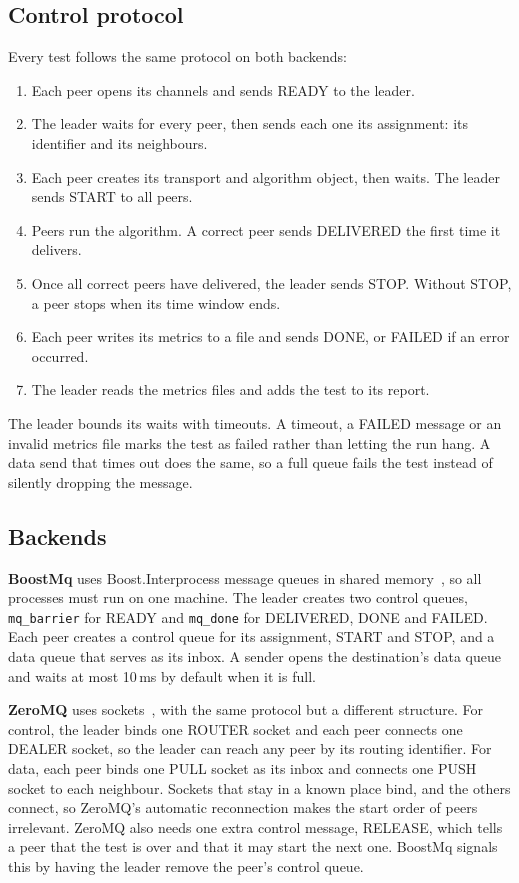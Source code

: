 \documentclass[11pt,a4paper]{article}
\newcommand{\code}[1]{\texttt{#1}}
\begin{document}
\subsection{Control protocol}

Every test follows the same protocol on both backends:
\begin{enumerate}
  \item Each peer opens its channels and sends READY to the leader.
  \item The leader waits for every peer, then sends each one its assignment: its identifier and its
    neighbours.
  \item Each peer creates its transport and algorithm object, then waits. The leader sends START to
    all peers.
  \item Peers run the algorithm. A correct peer sends DELIVERED the first time it delivers.
  \item Once all correct peers have delivered, the leader sends STOP. Without STOP, a peer stops
    when its time window ends.
  \item Each peer writes its metrics to a file and sends DONE, or FAILED if an error occurred.
  \item The leader reads the metrics files and adds the test to its report.
\end{enumerate}
The leader bounds its waits with timeouts. A timeout, a FAILED message or an invalid metrics file
marks the test as failed rather than letting the run hang. A data send that times out does the
same, so a full queue fails the test instead of silently dropping the message.

\subsection{Backends}

\textbf{BoostMq} uses Boost.Interprocess message queues in shared memory~\cite{boost-interprocess},
so all processes must run on one machine. The leader creates two control queues,
\code{mq\_barrier} for READY and \code{mq\_done} for DELIVERED, DONE and FAILED. Each peer creates a
control queue for its assignment, START and STOP, and a data queue that serves as its inbox. A
sender opens the destination's data queue and waits at most 10\,ms by default when it is full.

\textbf{ZeroMQ} uses sockets~\cite{zeromq-patterns}, with the same protocol but a different
structure. For control, the leader binds one ROUTER socket and each peer connects one DEALER socket,
so the leader can reach any peer by its routing identifier. For data, each peer binds one PULL
socket as its inbox and connects one PUSH socket to each neighbour. Sockets that stay in a known
place bind, and the others connect, so ZeroMQ's automatic reconnection makes the start order of
peers irrelevant. ZeroMQ also needs one extra control message, RELEASE, which tells a peer that the
test is over and that it may start the next one. BoostMq signals this by having the leader remove
the peer's control queue.
\end{document}
